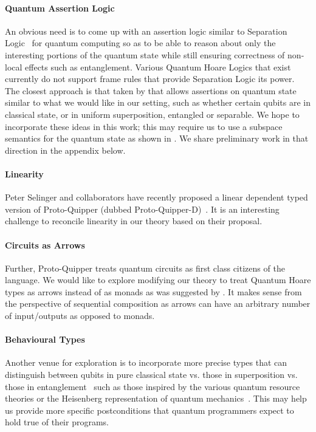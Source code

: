 \documentclass[acmsmall,nonacm,timestamp,review=false,anonymous=false]{acmart}
\begin{document}
\paragraph{Quantum Assertion Logic} An obvious need is to come up with an assertion logic similar to Separation Logic~\cite{reynolds2002} for quantum computing so as to be able to reason about only the interesting portions of the quantum state while still ensuring correctness of non-local effects such as entanglement. Various Quantum Hoare Logics that exist~\cite{ying_floydhoare_2012} currently do not support frame rules that provide Separation Logic its power. The closest approach is that taken by \citet{unruh2019} that allows assertions on quantum state similar to what we would like in our setting, such as whether certain qubits are in classical state, or in uniform superposition, entangled or separable. We hope to incorporate these ideas in this work; this may require us to use a subspace semantics for the quantum state as shown in \citet{unruh2019}. We share preliminary work in that direction in the appendix below.

\paragraph{Linearity} Peter Selinger and collaborators have recently proposed a linear dependent typed version of Proto-Quipper (dubbed Proto-Quipper-D)~\cite{selinger2020,fu2020linear}. It is an interesting challenge to reconcile linearity in our theory based on their proposal.

\paragraph{Circuits as Arrows} Further, Proto-Quipper treats quantum circuits as first class citizens of the language. We would like to explore modifying our theory to treat Quantum Hoare types as arrows instead of as monads as was suggested by \citet{so-arrows}. It makes sense from the perspective of sequential composition as arrows can have an arbitrary number of input/outputs as opposed to monads.

\paragraph{Behavioural Types} Another venue for exploration is to incorporate more precise types that can distinguish between qubits in pure classical state vs. those in superposition vs. those in entanglement~\cite{JorrandPerdrix2009} such as those inspired by the various quantum resource theories or the Heisenberg representation of quantum mechanics~\cite{rand_type_2019,rssl20}. This may help us provide more specific postconditions that quantum programmers expect to hold true of their programs.
\end{document}
